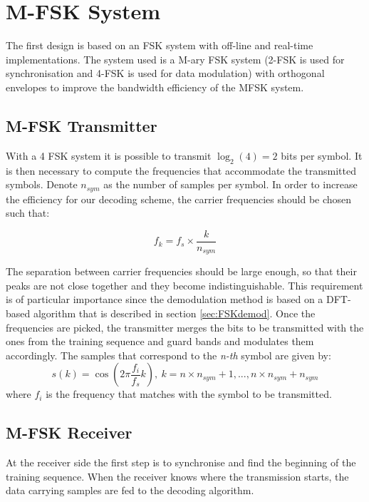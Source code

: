 \documentclass[12pt,a4paper,openright]{report}
\begin{document}
\section{M-FSK System}

The first design is based on an FSK system with off-line and real-time implementations. The system used is a M-ary FSK system (2-FSK is used for synchronisation and 4-FSK is used for data modulation) with orthogonal envelopes to improve the bandwidth efficiency of the MFSK system. 

\subsection{M-FSK Transmitter}

With a 4 FSK system it is possible to transmit $\log_2(4)=2$ bits per symbol. It is then necessary to compute the frequencies that accommodate the transmitted symbols. Denote $n_{sym}$ as the number of samples per symbol. In order to increase the efficiency for our decoding scheme, the carrier frequencies should be chosen such that:

\begin{equation}
f_k=f_s \times \frac{k}{n_{sym}}
\end{equation}

The separation between carrier frequencies should be large enough, so that their peaks are not close together and they become indistinguishable. This requirement is of particular importance since the demodulation method is based on a DFT-based algorithm that is described in section \ref{sec:FSKdemod}. %
Once the frequencies are picked, the transmitter merges the bits to be transmitted with the ones from the training sequence and guard bands and modulates them accordingly. The samples that correspond to the \emph{n-th} symbol are given by:
\begin{equation}
s(k) = \cos{(2\pi \frac{ f_i}{f_s} k)}, \ k=n\times n_{sym} +1, ... , n \times n_{sym}+n_{sym}
\end{equation}
where $f_i$ is the frequency that matches with the symbol to be transmitted.
 
 
  
\subsection{M-FSK Receiver}
At the receiver side the first step is to synchronise and find the beginning of the training sequence. When the receiver knows where the transmission starts, the data carrying samples are fed to the decoding algorithm. 
\end{document}
